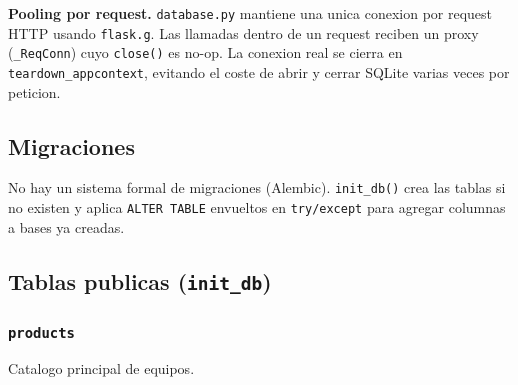 \documentclass[11pt,a4paper]{article}
\begin{document}
\begin{infobox}
\textbf{Pooling por request.} \texttt{database.py} mantiene una unica
conexion por request HTTP usando \texttt{flask.g}. Las llamadas dentro de
un request reciben un proxy (\texttt{\_ReqConn}) cuyo \texttt{close()} es
no-op. La conexion real se cierra en \texttt{teardown\_appcontext},
evitando el coste de abrir y cerrar SQLite varias veces por peticion.
\end{infobox}

\subsection{Migraciones}

No hay un sistema formal de migraciones (Alembic). \texttt{init\_db()} crea
las tablas si no existen y aplica \texttt{ALTER TABLE} envueltos en
\texttt{try/except} para agregar columnas a bases ya creadas.

\subsection{Tablas publicas (\texttt{init\_db})}

\subsubsection{\texttt{products}}
Catalogo principal de equipos.
\end{document}

